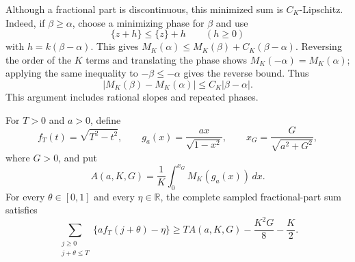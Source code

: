 \documentclass[11pt,reqno]{amsart}
\numberwithin{equation}{section}
\begin{document}
Although a fractional part is discontinuous, this minimized sum is
$C_K$-Lipschitz. Indeed, if $\beta\ge\alpha$, choose a minimizing phase
for $\beta$ and use
\[
 \{z+h\}\le\{z\}+h\qquad(h\ge0)
\]
with $h=k(\beta-\alpha)$. This gives
$M_K(\alpha)\le M_K(\beta)+C_K(\beta-\alpha)$.
Reversing the order of the $K$ terms and translating the phase shows
$M_K(-\alpha)=M_K(\alpha)$; applying the same inequality to
$-\beta\le-\alpha$ gives the reverse bound. Thus
\begin{equation}
 |M_K(\beta)-M_K(\alpha)|\le C_K|\beta-\alpha|.
 \label{eq:block-lipschitz}
\end{equation}
This argument includes rational slopes and repeated phases.

For $T>0$ and $a>0$, define
\[
 f_T(t)=\sqrt{T^2-t^2},\qquad
 g_a(x)=\frac{ax}{\sqrt{1-x^2}},\qquad
 x_G=\frac{G}{\sqrt{a^2+G^2}},
\]
where $G>0$, and put
\[
 A(a,K,G)=\frac1K\int_0^{x_G}M_K(g_a(x))\,dx.
\]
For every $\theta\in[0,1]$ and every $\eta\in\mathbb R$, the complete
sampled fractional-part sum satisfies
\begin{equation}
 \sum_{\substack{j\ge0\\j+\theta\le T}}
       \{a f_T(j+\theta)-\eta\}
 \ge T A(a,K,G)-\frac{K^2G}{8}-\frac K2.
 \label{eq:fractional-block}
\end{equation}
\end{document}
